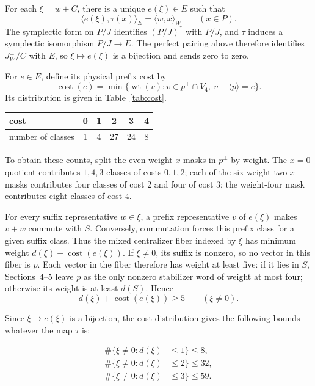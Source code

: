 \documentclass[11pt]{article}
\begin{document}
For each \(\xi=w+C\), there is a unique \(e(\xi)\in E\) such that
\[
\langle e(\xi),\tau(x)\rangle_{E}=\langle w,x\rangle_{W}
\qquad(x\in P).
\]
The symplectic form on \(P/J\) identifies \((P/J)^*\) with \(P/J\), and \(\tau\) induces a symplectic isomorphism \(P/J\to E\). The perfect pairing above therefore identifies \(J^\perp_{W}/C\) with \(E\), so \(\xi\mapsto e(\xi)\) is a bijection and sends zero to zero.

For \(e\in E\), define its physical prefix cost by
\[
\operatorname{cost}(e)=
\min\{\operatorname{wt}(v):v\in p^\perp\cap V_{4},\ v+\langle p\rangle=e\}.
\]
Its distribution is given in Table~\ref{tab:cost}.

{\small
\setlength{\tabcolsep}{8pt}
\renewcommand{\arraystretch}{1.08}
\begin{center}
\label{tab:cost}
\begin{tabular}{@{}lccccc@{}}
\toprule
cost & 0 & 1 & 2 & 3 & 4 \\
\midrule
number of classes & 1 & 4 & 27 & 24 & 8 \\
\bottomrule
\end{tabular}
\end{center}
}

To obtain these counts, split the even-weight \(x\)-masks in \(p^\perp\) by weight. The \(x=0\) quotient contributes \(1,4,3\) classes of costs \(0,1,2\); each of the six weight-two \(x\)-masks contributes four classes of cost \(2\) and four of cost \(3\); the weight-four mask contributes eight classes of cost \(4\).

For every suffix representative \(w\in\xi\), a prefix representative \(v\) of \(e(\xi)\) makes \(v+w\) commute with \(S\). Conversely, commutation forces this prefix class for a given suffix class. Thus the mixed centralizer fiber indexed by \(\xi\) has minimum weight \(d(\xi)+\operatorname{cost}(e(\xi))\). If \(\xi\ne0\), its suffix is nonzero, so no vector in this fiber is \(p\). Each vector in the fiber therefore has weight at least five: if it lies in \(S\), Sections~4--5 leave \(p\) as the only nonzero stabilizer word of weight at most four; otherwise its weight is at least \(d(S)\). Hence
\[
d(\xi)+\operatorname{cost}(e(\xi))\geq5
\qquad(\xi\ne0).
\]

Since \(\xi\mapsto e(\xi)\) is a bijection, the cost distribution gives the following bounds whatever the map \(\tau\) is:

\[
\begin{aligned}
\#\{\xi \ne 0 : d(\xi) &\leq 1\} \leq 8, \\
\#\{\xi \ne 0 : d(\xi) &\leq 2\} \leq 32, \\
\#\{\xi \ne 0 : d(\xi) &\leq 3\} \leq 59.
\end{aligned}
\]
\end{document}
